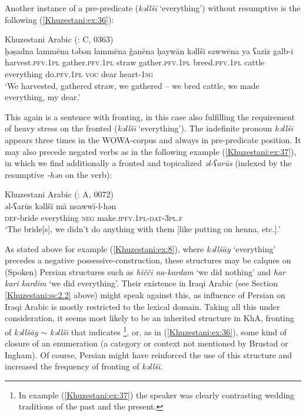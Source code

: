 \documentclass[output=paper,colorlinks,citecolor=brown,draftmode]{langscibook}
\begin{document}
Another instance of a pre-predicate  (\textit{kəllšī} `everything') without resumptive  is the following (\ref{Khuzestani:ex:36}): 

\ea\label{Khuzestani:ex:36}
Khuzestani Arabic (\citealt{leitnerArabic2021}: C, 0363) \\
\gll ḥəṣadna lammēna təbən lammēna ǧanēna ḥaywān kəllšī sawwēna ya ʕazīz galb-i \\
harvest\textsc{.pfv.1pl} gather\textsc{.pfv.1pl} straw gather\textsc{.pfv.1pl} breed\textsc{.pfv.1pl} cattle everything do\textsc{.pfv.1pl} \textsc{voc} dear heart\textsc{-1sg} \\
\glt `We harvested, gathered straw, we gathered – we bred cattle, we made everything, my dear.' 
\z

This again is a  sentence with  fronting, in this case also fulfilling the requirement of heavy stress on the fronted  (\textit{kəllšī} `everything'). The indefinite pronoun \textit{kəllšī} appears three times in the WOWA-corpus and always in pre-predicate position. It may also precede negated verbs as in the following example (\ref{Khuzestani:ex:37}), in which we find additionally a fronted and topicalized  \textit{əl-ʕarūs} (indexed by the resumptive  \textit{-hən} on the verb):

\ea\label{Khuzestani:ex:37}
Khuzestani Arabic (\citealt{leitnerArabic2021}: A, 0072) \\
\gll əl-ʕarūs kəllšī mā nsawwī-l-hən \\
\textsc{def-}bride everything \textsc{neg} make\textsc{.ipfv.1pl-dat-3pl.f} \\
\glt `The bride[s], we didn't do anything with them [like putting on henna, etc.].' 
\z

As stated above for example (\ref{Khuzestani:ex:8}), where \textit{kəllšāy} `everything' precedes a negative possessive-construction, these structures may be calques on (Spoken) Persian structures such as \textit{hičči na-kardam} `we did nothing' and \textit{har kari kardim} `we did everything'. Their existence in Iraqi Arabic (see Section \ref{Khuzestani:ss:2.2} above) might speak against this, as influence of Persian on Iraqi Arabic is mostly restricted to the lexical domain. Taking all this under consideration, it seems most likely to be an inherited structure in KhA,  fronting of \textit{kəllšāy} $\sim$ \textit{kəllšī} that indicates \footnote{ In example (\ref{Khuzestani:ex:37}) the speaker was clearly contrasting wedding traditions of the past and the present.}, or, as in (\ref{Khuzestani:ex:36}), some kind of closure of an enumeration (a category or context not mentioned by Brustad or Ingham). Of course, Persian  might have reinforced the use of this structure and increased the frequency of fronting of \textit{kəllšī}. 
\end{document}
